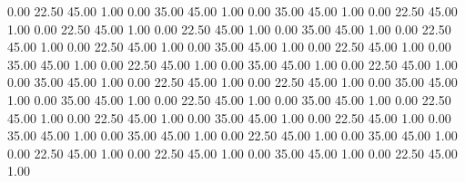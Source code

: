    0.00   22.50   45.00   1.00
   0.00   35.00   45.00   1.00
   0.00   35.00   45.00   1.00
   0.00   22.50   45.00   1.00
   0.00   22.50   45.00   1.00
   0.00   22.50   45.00   1.00
   0.00   35.00   45.00   1.00
   0.00   22.50   45.00   1.00
   0.00   22.50   45.00   1.00
   0.00   35.00   45.00   1.00
   0.00   22.50   45.00   1.00
   0.00   35.00   45.00   1.00
   0.00   22.50   45.00   1.00
   0.00   35.00   45.00   1.00
   0.00   22.50   45.00   1.00
   0.00   35.00   45.00   1.00
   0.00   22.50   45.00   1.00
   0.00   22.50   45.00   1.00
   0.00   35.00   45.00   1.00
   0.00   35.00   45.00   1.00
   0.00   22.50   45.00   1.00
   0.00   35.00   45.00   1.00
   0.00   22.50   45.00   1.00
   0.00   22.50   45.00   1.00
   0.00   35.00   45.00   1.00
   0.00   22.50   45.00   1.00
   0.00   35.00   45.00   1.00
   0.00   35.00   45.00   1.00
   0.00   22.50   45.00   1.00
   0.00   35.00   45.00   1.00
   0.00   22.50   45.00   1.00
   0.00   22.50   45.00   1.00
   0.00   35.00   45.00   1.00
   0.00   22.50   45.00   1.00